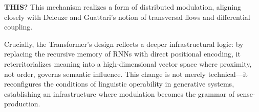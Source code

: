 
\begin{orangebox}
	\textbf{THIS?}
	This mechanism realizes a form of distributed modulation, aligning closely with Deleuze and Guattari’s notion of transversal flows and differential coupling.


	Crucially, the Transformer’s design reflects a deeper infrastructural logic: by replacing the recursive memory of RNNs with direct positional encoding, it reterritorializes meaning into a high-dimensional vector space where proximity, not order, governs semantic influence. This change is not merely technical—it reconfigures the conditions of linguistic operability in generative systems, establishing an infrastructure where modulation becomes the grammar of sense-production.
\end{orangebox}









